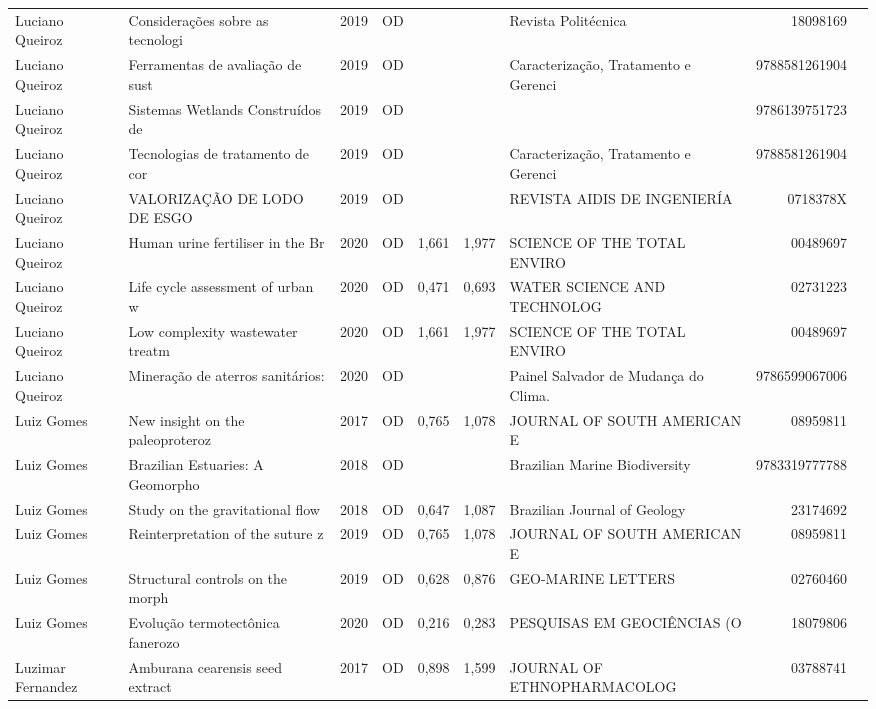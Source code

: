 \documentclass[12pt,brazil]{article}\usepackage[]{graphicx}\usepackage[]{xcolor}
\begin{document}
\begin{longtable}{lllrrllrr}
Luciano Queiroz & Considerações sobre as tecnologi & 2019 & OD &  &  & Revista Politécnica & 18098169 \\
Luciano Queiroz & Ferramentas de avaliação de sust & 2019 & OD &  &  & Caracterização, Tratamento e Gerenci & 9788581261904 \\
Luciano Queiroz & Sistemas Wetlands Construídos de & 2019 & OD &  &  &  & 9786139751723 \\
Luciano Queiroz & Tecnologias de tratamento de cor & 2019 & OD &  &  & Caracterização, Tratamento e Gerenci & 9788581261904 \\
Luciano Queiroz & VALORIZAÇÃO DE LODO DE ESGO & 2019 & OD &  &  & REVISTA AIDIS DE INGENIERÍA & 0718378X \\
Luciano Queiroz & Human urine fertiliser in the Br & 2020 & OD & 1,661 & 1,977 & SCIENCE OF THE TOTAL ENVIRO & 00489697 \\
Luciano Queiroz & Life cycle assessment of urban w & 2020 & OD & 0,471 & 0,693 & WATER SCIENCE AND TECHNOLOG & 02731223 \\
Luciano Queiroz & Low complexity wastewater treatm & 2020 & OD & 1,661 & 1,977 & SCIENCE OF THE TOTAL ENVIRO & 00489697 \\
Luciano Queiroz & Mineração de aterros sanitários: & 2020 & OD &  &  & Painel Salvador de Mudança do Clima. & 9786599067006 \\
Luiz Gomes & New insight on the paleoproteroz & 2017 & OD & 0,765 & 1,078 & JOURNAL OF SOUTH AMERICAN E & 08959811 \\
Luiz Gomes & Brazilian Estuaries: A Geomorpho & 2018 & OD &  &  & Brazilian Marine Biodiversity & 9783319777788 \\
Luiz Gomes & Study on the gravitational flow  & 2018 & OD & 0,647 & 1,087 & Brazilian Journal of Geology & 23174692 \\
Luiz Gomes & Reinterpretation of the suture z & 2019 & OD & 0,765 & 1,078 & JOURNAL OF SOUTH AMERICAN E & 08959811 \\
Luiz Gomes & Structural controls on the morph & 2019 & OD & 0,628 & 0,876 & GEO-MARINE LETTERS & 02760460 \\
Luiz Gomes & Evolução termotectônica fanerozo & 2020 & OD & 0,216 & 0,283 & PESQUISAS EM GEOCIÊNCIAS (O & 18079806 \\
\rowcolor{coautr}\rowcolor{coautr}\rowcolor{coautr}\rowcolor{coautr}\rowcolor{coautr}\rowcolor{coautr}\rowcolor{coautr}\rowcolor{coautr}\rowcolor{coautr}\rowcolor{coautr}\rowcolor{coautr}\rowcolor{coautr}\rowcolor{coautr}\rowcolor{coautr}\rowcolor{coautr}\rowcolor{coautr}Luzimar Fernandez & Amburana cearensis seed extract  & 2017 & OD & 0,898 & 1,599 & JOURNAL OF ETHNOPHARMACOLOG & 03788741 \\

\end{longtable}
\end{document}
